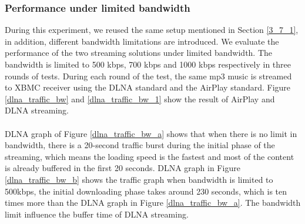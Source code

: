 \subsubsection{Performance under limited bandwidth\label{4_1_2}}
During this experiment, we reused the same setup mentioned in Section \ref{3_7_1}, in addition, different bandwidth limitations are introduced. We evaluate the performance of the two streaming solutions under limited bandwidth. The bandwidth is limited to 500 kbps, 700 kbps and 1000 kbps respectively in three rounds of tests. During each round of the test, the same mp3 music is streamed to XBMC receiver using the DLNA standard and the AirPlay standard. Figure \ref{dlna_traffic_bw} and \ref{dlna_traffic_bw_1} show the result of AirPlay and DLNA streaming.\\
\\
DLNA graph of Figure \ref{dlna_traffic_bw_a} shows that when there is no limit in bandwidth, there is a 20-second traffic burst during the initial phase of the streaming, which means the loading speed is the fastest and most of the content is already buffered in the first 20 seconds. DLNA graph in Figure \ref{dlna_traffic_bw_b} shows the traffic graph when bandwidth is limited to 500kbps, the initial downloading phase takes around 230 seconds, which is ten times more than the DLNA graph in Figure \ref{dlna_traffic_bw_a}. The bandwidth limit influence the buffer time of DLNA streaming.

